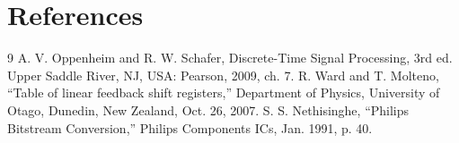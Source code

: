 \documentclass[11pt,onecolumn]{IEEEtran}
\begin{document}
\newpage
\section{References}
\renewcommand{\refname}{} %
\renewcommand{\bibname}{} %
\vspace{-1cm}
\begin{thebibliography}{9} %
   A. V. Oppenheim and R. W. Schafer, Discrete-Time Signal Processing, 3rd ed. Upper Saddle River, NJ, USA: Pearson, 2009, ch. 7.
   R. Ward and T. Molteno, “Table of linear feedback shift registers,” Department of Physics, University of Otago, Dunedin, New Zealand, Oct. 26, 2007.
   S. S. Nethisinghe, “Philips Bitstream Conversion,” Philips Components ICs, Jan. 1991, p. 40.
    
      


\end{thebibliography}
\end{document}
